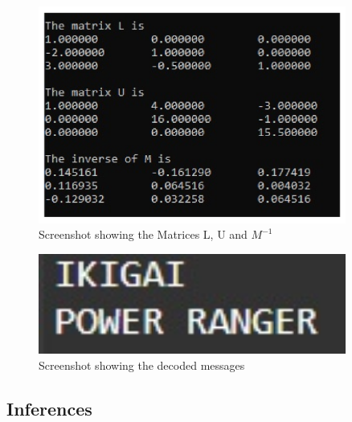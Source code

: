 \documentclass[titlepage, 11pt]{article}
\begin{document}
\begin{figure}[!tbh]
  	\centering
  	\includegraphics[width=0.9\textwidth]{Problem2.pdf}  
  	\caption{Screenshot showing the Matrices L, U and $M^{-1}$}
  	\label{fig:q12} 
\end{figure}

\begin{figure}[!tbh]
  	\centering
  	\includegraphics[width=0.9\textwidth]{Problem2b.png}  
  	\caption{Screenshot showing the decoded messages}
  	\label{fig:q13} 
\end{figure}



\subsection{Inferences}
\end{document}
